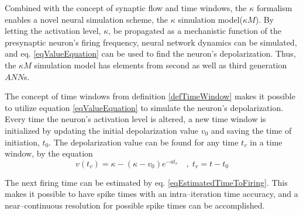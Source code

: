 		Combined with the concept of synaptic flow and time windows, the $\kappa$ formalism enables a novel neural simulation scheme, the $\kappa$ simulation model($\kappa M$).
		By letting the activation level, $\kappa$, be propagated as a mechanistic function of the presynaptic neuron's firing frequency,
			neural network dynamics can be simulated, and eq. \ref{eqValueEquation} can be used to find the neuron's depolarization.
		Thus, the $\kappa M$ simulation model has elements from second as well as third generation $ANN$s.

		The concept of time windows from definition \ref{defTimeWindow} makes it possible to utilize equation \ref{eqValueEquation} to simulate the neuron's depolarization.
		Every time the neuron's activation level is altered, a new time window is initialized by updating the initial depolarization 
			value $v_0$ and saving the time of initiation, $t_0$.
		The depolarization value can be found for any time $t_v$ in a time window, by the equation
\begin{equation}
 	v(t_v) = \kappa - \left( \kappa - v_0 \right) e^{-at_v} 	\quad,\; t_v = t - t_0
	\label{eqValueEquationForEachTimeWindow}
\end{equation}

		The next firing time can be estimated by eq. \ref{eqEstimatedTimeToFiring}. %
		This makes it possible to have spike times with an intra--iteration time accuracy, and a near--continuous resolution for possible spike times can be accomplished.



















